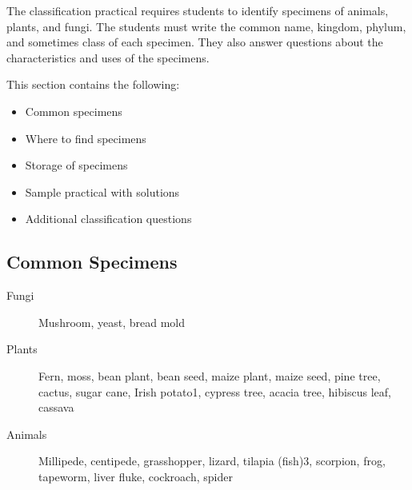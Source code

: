 The classification practical requires students to identify specimens of animals, plants, and fungi. The students must write the common name, kingdom, phylum, and sometimes class of each specimen. They also answer questions about the characteristics and uses of the specimens.

This section contains the following:
\begin{itemize}
\item{Common specimens}
\item{Where to find specimens}
\item{Storage of specimens}
\item{Sample practical with solutions}
\item{Additional classification questions}
\end{itemize}

\subsection{Common Specimens}
\begin{description}
\item[Fungi]{Mushroom, yeast, bread mold}
\item[Plants]{Fern, moss, bean plant, bean seed, maize plant, maize seed, pine tree, cactus, sugar cane, Irish potato1, cypress tree, acacia tree, hibiscus leaf, cassava}
\item[Animals]{Millipede, centipede, grasshopper, lizard, tilapia (fish)3, scorpion, frog, tapeworm, liver fluke, cockroach, spider}
\end{description}

